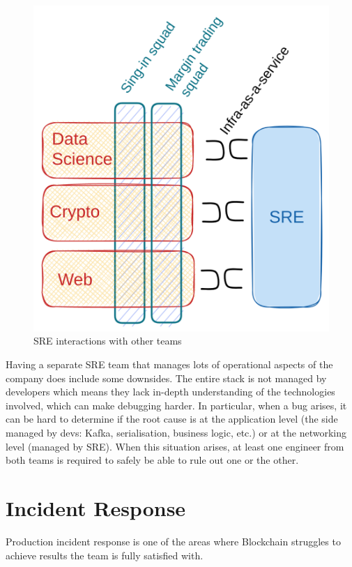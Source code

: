 \documentclass[conference]{IEEEtran}
\begin{document}
    \begin{figure}[h]
        \centering
        \includegraphics[width=0.67\columnwidth]{sreAsAService}
        \caption{SRE interactions with other teams\footnotemark}
        \label{fig:sre}
    \end{figure}

    Having a separate SRE team that manages lots of operational aspects of the company does include some downsides.
    The entire stack is not managed by developers which means they lack in-depth understanding of the technologies involved, which can make debugging harder.
    In particular, when a bug arises, it can be hard to determine if the root cause is at the application level (the side managed by devs: Kafka, serialisation, business logic, etc.) or at the networking level (managed by SRE).
    When this situation arises, at least one engineer from both teams is required to safely be able to rule out one or the other.


    \section{Incident Response}\label{sec:incident-response}

    Production incident response is one of the areas where Blockchain struggles to achieve results the team is fully satisfied with.
\end{document}

